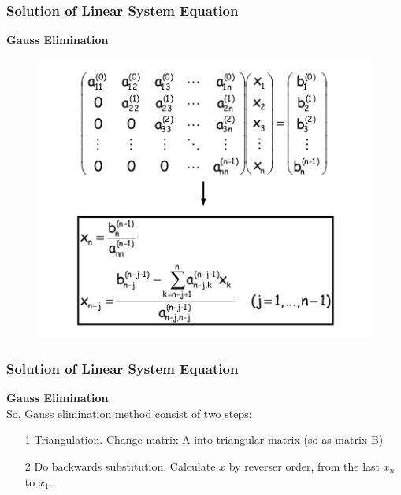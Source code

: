 \documentclass{beamer}
\begin{document}
\begin{frame}
\frametitle{Solution of Linear System Equation}
\textbf{Gauss Elimination}
\begin{figure}
\centering
\includegraphics[scale=0.4]{cc.png}
\end{figure}
\end{frame}

\begin{frame}
\frametitle{Solution of Linear System Equation}
\textbf{Gauss Elimination} \\ 
So, Gauss elimination method consist of two steps:
\begin{itemize}
\item[1] Triangulation. Change matrix A into triangular matrix (so as matrix B)
\item[2] Do backwards substitution. Calculate $x$ by reverser order, from the last $x_n$ to $x_1$.
\end{itemize}
\end{frame}
\end{document}
